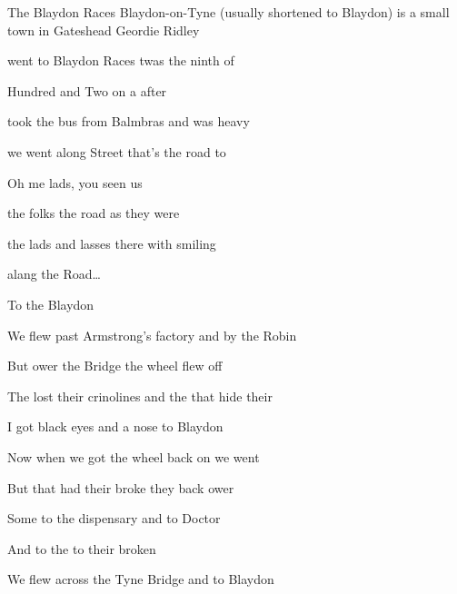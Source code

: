 \begin{SBSong}{The Blaydon Races}
  {Blaydon-on-Tyne (usually shortened to Blaydon) is a small town in Gateshead}
  {Geordie Ridley}
  \begin{SBVerse}
     went to Blaydon Races twas the ninth of 
    
     Hundred and  Two on a  after 
    
     took the bus from Balmbras and  was heavy 
    
     we went along  Street that's  the road to 
  \end{SBVerse}
  \begin{SBChorus}
    Oh me lads, you  seen us 
    
     the folks  the road  as they were 
    
     the lads and lasses there  with smiling 
    
     alang the  Road\ldots
    
    To  the Blaydon 
  \end{SBChorus}
  \begin{SBVerse}
    We flew past Armstrong's factory and  by the Robin 
    
    But  ower the  Bridge the  wheel flew off 
    
    The  lost their crinolines and the  that hide their 
    
    I got  black eyes and a  nose  to Blaydon 
  \end{SBVerse}
  \begin{SBVerse}
    Now when we got the wheel back on  we went 
    
    But  that had their  broke they  back ower 
    
    Some  to the dispensary and  to Doctor 
    
    And  to the  to  their broken 
  \end{SBVerse}
  \begin{SBVerse}
    We flew across the Tyne Bridge and  to Blaydon 
    

\end{SBVerse}
\end{SBSong}
